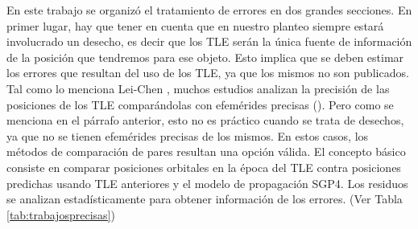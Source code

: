 En este trabajo se organiz\'o el tratamiento de errores en dos grandes secciones. En primer lugar, hay que tener en cuenta que en nuestro planteo siempre estar\'a involucrado un desecho, es decir que los TLE ser\'an la \'unica fuente de informaci\'on de la posici\'on que tendremos para ese objeto. Esto implica que se deben estimar los errores que resultan del uso de los TLE, ya que los mismos no son publicados.\\

Tal como lo menciona Lei-Chen \citep{leichen}, muchos estudios analizan la precisi\'on de las posiciones de los TLE compar\'andolas con efem\'erides precisas ({\color{red}{resumen de trabajos sobre esto}}). Pero como se menciona en el p\'arrafo anterior, esto no es pr\'actico cuando se trata de desechos, ya que no se tienen efem\'erides precisas de los mismos. En estos casos, los m\'etodos de comparaci\'on de pares resultan una opci\'on v\'alida. El concepto b\'asico consiste en comparar posiciones orbitales en la \'epoca del TLE contra posiciones predichas usando TLE anteriores y el modelo de propagaci\'on SGP4. Los residuos se analizan estad\'isticamente para obtener informaci\'on de los errores. (Ver Tabla \ref{tab:trabajosprecisas})

